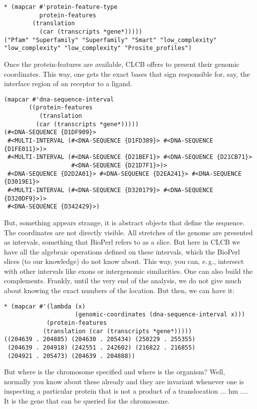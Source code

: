 \documentclass{book}
\newcommand\CLCB{CLCB }
\newcommand\eg{e.\,g.}
\begin{document}
\begin{lstlisting}
* (mapcar #'protein-feature-type
          protein-features
	    (translation
	      (car (transcripts *gene*)))))
("Pfam" "Superfamily" "Superfamily" "Smart" "low_complexity"
"low_complexity" "low_complexity" "Prosite_profiles")
\end{lstlisting}

Once the protein-features are available, \CLCB offers to 
present their genomic coordinates. This way, one gets the
exact bases that sign responsible for, say, the interface
region of an receptor to a ligand.

\begin{lstlisting}
(mapcar #'dna-sequence-interval
       ((protein-features
          (translation
	     (car (transcripts *gene*)))))
(#<DNA-SEQUENCE {D1DF909}>
 #<MULTI-INTERVAL (#<DNA-SEQUENCE {D1FD389}> #<DNA-SEQUENCE {D1FE011}>)>
 #<MULTI-INTERVAL (#<DNA-SEQUENCE {D21BEF1}> #<DNA-SEQUENCE {D21CB71}>
                   #<DNA-SEQUENCE {D21D7F1}>)>
 #<DNA-SEQUENCE {D2D2A01}> #<DNA-SEQUENCE {D2EA241}> #<DNA-SEQUENCE {D3019E1}>
 #<MULTI-INTERVAL (#<DNA-SEQUENCE {D320179}> #<DNA-SEQUENCE {D320DF9}>)>
 #<DNA-SEQUENCE {D342429}>)
\end{lstlisting}

But, something appears strange, it is abstract objects that define the sequence.
The coordinates are
not directly visible. All stretches of the genome are presented
as intervals, something that BioPerl refers to as a slice. But here
in \CLCB we have all the algebraic operations defined on these intervals,
which the BioPerl slices (to our knowledge) do not know about. This way,
you can, \eg,  intersect with other intervals like exons or intergenomic
similarities.  One can also build the complements. Frankly, until the
very end of the analysis, we do not give much about knowing the exact
numbers of the location.  But then, we can have it:

\begin{lstlisting}
* (mapcar #'(lambda (x)
                    (genomic-coordinates (dna-sequence-interval x)))
            (protein-features
	       (translation (car (transcripts *gene*)))))
((204639 . 204885) (204630 . 205434) (250229 . 255355)
 (204639 . 204918) (242551 . 242602) (216822 . 216855)
 (204921 . 205473) (204639 . 204888))
\end{lstlisting}

But where is the chromosome specified and where is the organism? Well,
normally you know about these already and they are invariant whenever
one is inspecting a particular protein that is not a product of a
translocation $\ldots$ hm $\ldots$. It is the gene that can
be queried for the chromosome.
\end{document}
